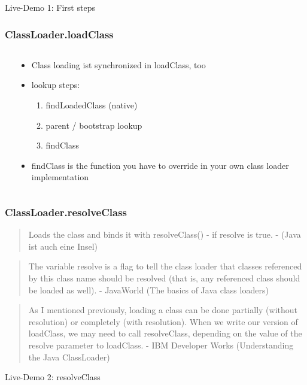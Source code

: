 \documentclass[aspectratio=169]{beamer}
\begin{document}
\begin{frame}
	Live-Demo 1: First steps
\end{frame}

\begin{frame}
	\frametitle{ClassLoader.loadClass}
	\begin{columns}[T] 
		\begin{column}{.57\textwidth}
			
		\end{column}
		\hfill
		\begin{column}{.43\textwidth}
			\begin{itemize}
				\item{Class loading ist synchronized in loadClass, too}
				\item{lookup steps:}
				\begin{enumerate}
					\item{findLoadedClass (native)}
					\item{parent / bootstrap lookup}
					\item{findClass}
				\end{enumerate}
				\item{findClass is the function you have to override in your own class loader implementation}
			\end{itemize}
		\end{column}
	\end{columns}
\end{frame}

\begin{frame}
	\frametitle{ClassLoader.resolveClass}
	
	\begin{quote}
		\tiny{Loads the class and binds it with resolveClass() - if resolve is true. - (Java ist auch eine Insel)}
	\end{quote}
	\begin{quote}
		\tiny{The variable resolve is a flag to tell the class loader that classes referenced by this class name should be resolved (that is, any referenced class should be loaded as well). - JavaWorld (The basics of Java class loaders)}
	\end{quote}
	\begin{quote}
	\tiny{As I mentioned previously, loading a class can be done partially (without resolution) or completely (with resolution). When we write our version of loadClass, we may need to call resolveClass, depending on the value of the resolve parameter to loadClass. - IBM Developer Works (Understanding the Java ClassLoader)}
	\end{quote}
	Live-Demo 2: resolveClass 
	\pause
	
\end{frame}
\end{document}
